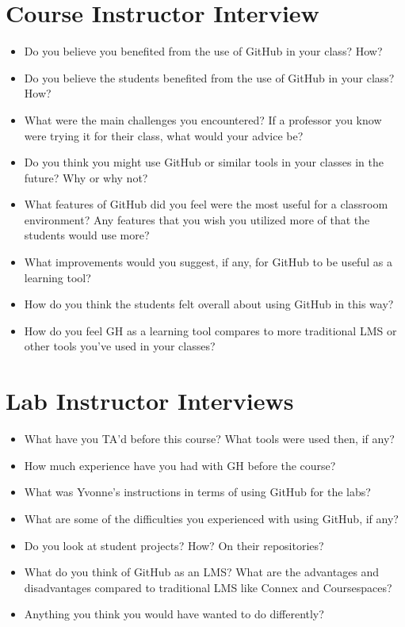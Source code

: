 \section{Course Instructor Interview}
\begin{itemize}
    \item Do you believe you benefited from the use of GitHub in your class? How?
    \item Do you believe the students benefited from the use of GitHub in your class? How?
    \item What were the main challenges you encountered? If a professor you know were trying it for their class, what would your advice be?
    \item Do you think you might use GitHub or similar tools in your classes in the future? Why or why not?
    \item What features of GitHub did you feel were the most useful for a classroom environment? Any features that you wish you utilized more of that the students would use more?
    \item What improvements would you suggest, if any, for GitHub to be useful as a learning tool?
    \item How do you think the students felt overall about using GitHub in this way?
    \item How do you feel GH as a learning tool compares to more traditional LMS or other tools you’ve used in your classes?
\end{itemize}

\section{Lab Instructor Interviews}
\begin{itemize}
    \item What have you TA’d before this course? What tools were used then, if any?
    \item How much experience have you had with GH before the course?
    \item What was Yvonne’s instructions in terms of using GitHub for the labs?
    \item What are some of the difficulties you experienced with using GitHub, if any?
    \item Do you look at student projects? How? On their repositories?
    \item What do you think of GitHub as an LMS? What are the advantages and disadvantages compared to traditional LMS like Connex and Coursespaces?
    \item Anything you think you would have wanted to do differently?
\end{itemize}

